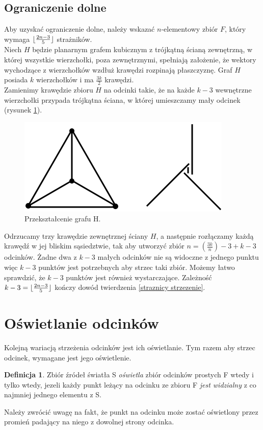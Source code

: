 \documentclass[brudnopis]{xmgr}
\DeclarePairedDelimiter\floor{\lfloor}{\rfloor}
\theoremstyle{definition}
\newtheorem{Definicja}{Definicja}
\begin{document}
\subsection{Ograniczenie dolne}
\indent Aby uzyskać ograniczenie dolne, należy wskazać $n$-elementowy zbiór $F$, który wymaga $\floor{\frac{2n-3}{5}}$ strażników.
\\\indent Niech $H$ będzie planarnym grafem kubicznym z trójkątną ścianą zewnętrzną, w której wszystkie wierzchołki, poza zewnętrznymi, spełniają założenie, że wektory wychodzące z wierzchołków wzdłuż krawędzi rozpinają płaszczyznę. Graf $H$ posiada $k$ wierzchołków i ma $\frac{3k}{2}$ krawędzi.
\\\indent Zamienimy krawędzie zbioru $H$ na odcinki takie, że na każde $k - 3$ wewnętrzne wierzchołki przypada trójkątna ściana, w której umieszczamy mały odcinek (rysunek \ref{fig:przeksztalcenie h}).
\begin{figure}[ht!]
 \centering
  \includegraphics{rysunki/dolna_granica.png}
  \caption{Przekształcenie grafu H.}
  \label{fig:przeksztalcenie h}
\end{figure} 
Odrzucamy trzy krawędzie zewnętrznej ściany $H$, a następnie rozłączamy każdą krawędź w jej bliskim sąsiedztwie, tak aby utworzyć zbiór $n = (\frac{3k}{n}) - 3 + k  - 3$ odcinków. Żadne dwa z $k - 3$ małych odcinków nie są widoczne z jednego punktu więc $k - 3$ punktów jest potrzebnych aby strzec taki zbiór. Możemy łatwo sprawdzić, że $k - 3$ punktów jest również wystarczające. Zależność $k - 3 = \floor{\frac{2n - 3}{5}}$ kończy dowód twierdzenia \ref{straznicy strzezenie}.

\section{Oświetlanie odcinków}\label{oświetlanie odcinków}
Kolejną wariacją strzeżenia odcinków jest ich oświetlanie. Tym razem aby strzec odcinek, wymagane jest jego oświetlenie.
\begin{Definicja}
	Zbiór źródeł światła S \emph{oświetla} zbiór odcinków prostych F wtedy i tylko wtedy, jezeli każdy punkt leżący na odcinku ze zbioru F \emph{jest widzialny} z co najmniej jednego elementu z S.
\end{Definicja} Należy zwrócić uwagę na fakt, że punkt na odcinku może zostać oświetlony przez promień padający na niego z dowolnej strony odcinka.
\end{document}

